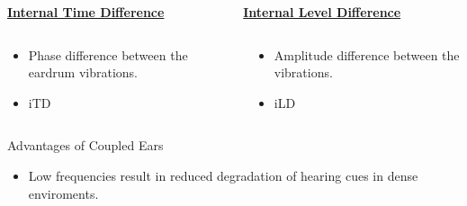 \documentclass{beamer}
\begin{document}
\begin{frame}[t]
\begin{exampleblock}{}
{\begin{columns}
    \begin{column}{0.5\textwidth}
    \centering
    \underline{\textbf{Internal Time Difference}}

    \end{column}
     
    \begin{column}{0.5\textwidth}
    \centering
    \underline{\textbf{Internal Level Difference}}
    \end{column}
    
  \end{columns}
  
    \begin{columns}
 
    \begin{column}{0.5\textwidth}
    \small
     \begin{itemize}
    \item[] Phase difference between the eardrum vibrations.
    \item iTD
     \end{itemize}
    \end{column}
     
    \begin{column}{0.5\textwidth}
    \small
     \begin{itemize}
          \item[] Amplitude difference between the vibrations.
          \item iLD
     \end{itemize}
    \end{column}
    
  \end{columns}}
  \end{exampleblock}
\end{frame}


\begin{frame}[t]
 \begin{exampleblock}{Advantages of Coupled Ears}
 \begin{itemize}
  \item Low frequencies result in reduced degradation of hearing cues in dense enviroments.
 \end{itemize}

  
 \end{exampleblock}

\end{frame}
\end{document}
